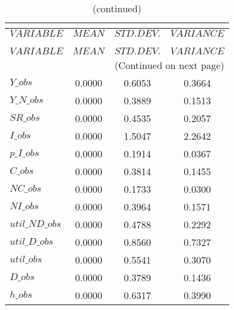  
\begin{center}
\begin{longtable}{lccc} 
\caption{THEORETICAL MOMENTS}\\
 \label{Table:th_moments}\\
\toprule 
$VARIABLE       $	 & 	 $         MEAN$	 & 	 $    STD. DEV.$	 & 	 $     VARIANCE$\\
\midrule \endfirsthead 
\caption{(continued)}\\
 \toprule \\ 
$VARIABLE       $	 & 	 $         MEAN$	 & 	 $    STD. DEV.$	 & 	 $     VARIANCE$\\
\midrule \endhead 
\midrule \multicolumn{4}{r}{(Continued on next page)} \\ \bottomrule \endfoot 
\bottomrule \endlastfoot 
$Y\_obs         $	 & 	       0.0000	 & 	       0.6053	 & 	       0.3664 \\ 
$Y\_N\_obs      $	 & 	       0.0000	 & 	       0.3889	 & 	       0.1513 \\ 
$SR\_obs        $	 & 	       0.0000	 & 	       0.4535	 & 	       0.2057 \\ 
$I\_obs         $	 & 	       0.0000	 & 	       1.5047	 & 	       2.2642 \\ 
$p\_I\_obs      $	 & 	       0.0000	 & 	       0.1914	 & 	       0.0367 \\ 
$C\_obs         $	 & 	       0.0000	 & 	       0.3814	 & 	       0.1455 \\ 
$NC\_obs        $	 & 	       0.0000	 & 	       0.1733	 & 	       0.0300 \\ 
$NI\_obs        $	 & 	       0.0000	 & 	       0.3964	 & 	       0.1571 \\ 
$util\_ND\_obs  $	 & 	       0.0000	 & 	       0.4788	 & 	       0.2292 \\ 
$util\_D\_obs   $	 & 	       0.0000	 & 	       0.8560	 & 	       0.7327 \\ 
$util\_obs      $	 & 	       0.0000	 & 	       0.5541	 & 	       0.3070 \\ 
$D\_obs         $	 & 	       0.0000	 & 	       0.3789	 & 	       0.1436 \\ 
$h\_obs         $	 & 	       0.0000	 & 	       0.6317	 & 	       0.3990 \\ 
\end{longtable}
 \end{center}
